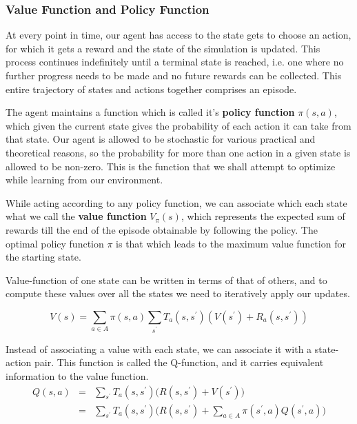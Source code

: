 \subsubsection{Value Function and Policy Function}

At every point in time, our agent has access to the state gets to choose an action, for which it gets a reward and the state of the simulation is updated. 
This process continues indefinitely until a terminal state is reached, i.e. one where no further progress needs to be made and no future rewards can be collected. This entire trajectory of states and actions together comprises an episode.

The agent maintains a function which is called it's \textbf{policy function} $\pi(s, a)$, which given the current state gives the probability of each action it can take from that state. Our agent is allowed to be stochastic for various practical and theoretical reasons, so the probability for more than one action in a given state is allowed to be non-zero. This is the function that we shall attempt to optimize while learning from our environment.

While acting according to any policy function, we can associate which each state what we call the \textbf{value function} $V_{\pi}(s)$, which represents the expected sum of rewards till the end of the episode obtainable by following the policy. The optimal policy function $\pi$ is that which leads to the maximum value function for the starting state.

Value-function of one state can be written in terms of that of others, and to compute these values over all the states we need to iteratively apply our updates.

\begin{equation}
    V(s) = \sum_{a \in A} \pi(s, a) \sum_{s^\prime} T_a(s, s^\prime) (V(s^\prime) + R_a(s, s^\prime))
\end{equation}

Instead of associating a value with each state, we can associate it with a state-action pair. This function is called the Q-function, and it carries equivalent information to the value function.
\begin{eqnarray}\label{eqn:defn-q-v-fn}
    Q(s, a) &=& \sum_{s^\prime} T_a(s, s^\prime) \bigg(R(s, s^\prime) + V(s^\prime) \bigg)\\
            &=& \sum_{s^\prime} T_a(s, s^\prime) \bigg(R(s, s^\prime) + \sum_{a \in A} \pi(s^\prime, a) Q(s^\prime, a)\bigg)
\end{eqnarray}

